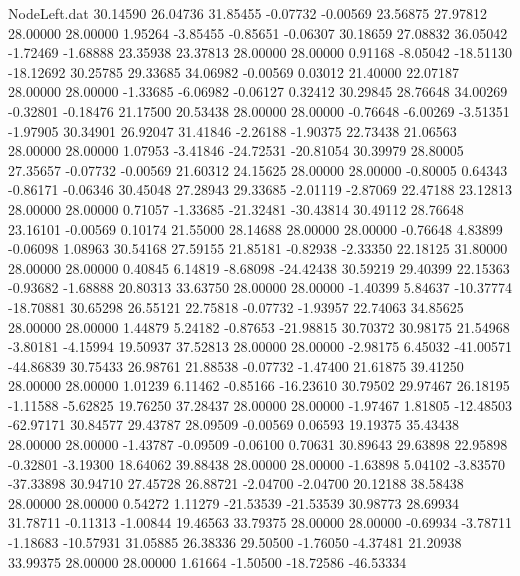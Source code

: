 \begin{filecontents}{NodeLeft.dat}
  30.14590   26.04736   31.85455    -0.07732   -0.00569   23.56875   27.97812   28.00000   28.00000    1.95264   -3.85455   -0.85651   -0.06307
  30.18659   27.08832   36.05042    -1.72469   -1.68888   23.35938   23.37813   28.00000   28.00000    0.91168   -8.05042  -18.51130  -18.12692
  30.25785   29.33685   34.06982    -0.00569    0.03012   21.40000   22.07187   28.00000   28.00000   -1.33685   -6.06982   -0.06127    0.32412
  30.29845   28.76648   34.00269    -0.32801   -0.18476   21.17500   20.53438   28.00000   28.00000   -0.76648   -6.00269   -3.51351   -1.97905
  30.34901   26.92047   31.41846    -2.26188   -1.90375   22.73438   21.06563   28.00000   28.00000    1.07953   -3.41846  -24.72531  -20.81054
  30.39979   28.80005   27.35657    -0.07732   -0.00569   21.60312   24.15625   28.00000   28.00000   -0.80005    0.64343   -0.86171   -0.06346
  30.45048   27.28943   29.33685    -2.01119   -2.87069   22.47188   23.12813   28.00000   28.00000    0.71057   -1.33685  -21.32481  -30.43814
  30.49112   28.76648   23.16101    -0.00569    0.10174   21.55000   28.14688   28.00000   28.00000   -0.76648    4.83899   -0.06098    1.08963
  30.54168   27.59155   21.85181    -0.82938   -2.33350   22.18125   31.80000   28.00000   28.00000    0.40845    6.14819   -8.68098  -24.42438
  30.59219   29.40399   22.15363    -0.93682   -1.68888   20.80313   33.63750   28.00000   28.00000   -1.40399    5.84637  -10.37774  -18.70881
  30.65298   26.55121   22.75818    -0.07732   -1.93957   22.74063   34.85625   28.00000   28.00000    1.44879    5.24182   -0.87653  -21.98815
  30.70372   30.98175   21.54968    -3.80181   -4.15994   19.50937   37.52813   28.00000   28.00000   -2.98175    6.45032  -41.00571  -44.86839
  30.75433   26.98761   21.88538    -0.07732   -1.47400   21.61875   39.41250   28.00000   28.00000    1.01239    6.11462   -0.85166  -16.23610
  30.79502   29.97467   26.18195    -1.11588   -5.62825   19.76250   37.28437   28.00000   28.00000   -1.97467    1.81805  -12.48503  -62.97171
  30.84577   29.43787   28.09509    -0.00569    0.06593   19.19375   35.43438   28.00000   28.00000   -1.43787   -0.09509   -0.06100    0.70631
  30.89643   29.63898   22.95898    -0.32801   -3.19300   18.64062   39.88438   28.00000   28.00000   -1.63898    5.04102   -3.83570  -37.33898
  30.94710   27.45728   26.88721    -2.04700   -2.04700   20.12188   38.58438   28.00000   28.00000    0.54272    1.11279  -21.53539  -21.53539
  30.98773   28.69934   31.78711    -0.11313   -1.00844   19.46563   33.79375   28.00000   28.00000   -0.69934   -3.78711   -1.18683  -10.57931
  31.05885   26.38336   29.50500    -1.76050   -4.37481   21.20938   33.99375   28.00000   28.00000    1.61664   -1.50500  -18.72586  -46.53334

\end{filecontents}
